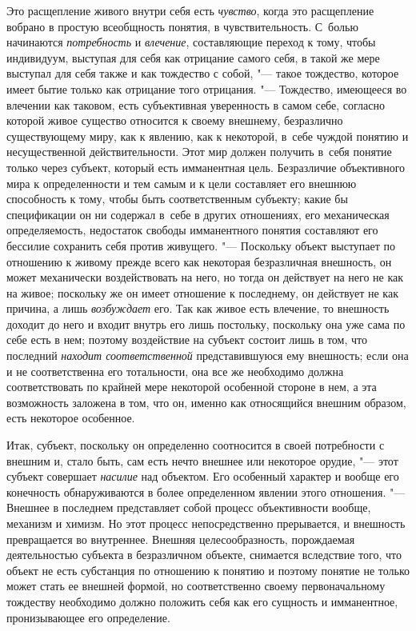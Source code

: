 Это расщепление живого внутри себя есть
{\em чувство}, когда это
расщепление вобрано в простую всеобщность понятия, в чувствительность.
С~болью начинаются {\em потребность}
и {\em влечение},
составляющие переход к тому, чтобы индивидуум, выступая для
себя как отрицание самого себя, в такой же мере выступал для себя также и
как тождество с собой, "--- такое тождество, которое имеет
бытие только как отрицание того отрицания. "--- Тождество,
имеющееся во влечении как таковом, есть субъективная уверенность в самом
себе, согласно которой живое существо относится к своему внешнему,
безразлично существующему миру, как к явлению, как к некоторой, в~себе
чуждой понятию и несущественной действительности. Этот мир
должен получить в~себя понятие только через субъект, который
есть имманентная цель. Безразличие объективного мира к определенности и тем
самым и к цели составляет его внешнюю способность к тому, чтобы быть
соответственным субъекту; какие бы спецификации он ни содержал в~себе в
других отношениях, его механическая определяемость, недостаток свободы
имманентного понятия составляют его бессилие сохранить себя против
живущего. "--- Поскольку объект выступает по отношению к живому
прежде всего как некоторая безразличная внешность, он может механически
воздействовать на него, но тогда он действует на него не как на живое;
поскольку же он имеет отношение к последнему, он действует не как причина,
а лишь {\em возбуждает}
его. Так как живое есть влечение, то внешность доходит до
него и входит внутрь его лишь постольку, поскольку она уже сама по себе
есть в нем; поэтому воздействие на субъект состоит лишь в том, что
последний {\em находит соответственной}
представившуюся ему внешность; если она и не соответственна
его тотальности, она все же необходимо должна соответствовать по крайней
мере некоторой особенной стороне в нем, а эта возможность заложена в том,
что он, именно как относящийся внешним образом, есть некоторое особенное.

Итак, субъект, поскольку он определенно соотносится в своей
потребности с внешним и, стало быть, сам есть нечто внешнее или некоторое
орудие, "--- этот субъект совершает
{\em насилие} над
объектом. Его особенный характер и вообще его конечность обнаруживаются в
более определенном явлении этого отношения. "--- Внешнее в
последнем представляет собой процесс объективности вообще, механизм и
химизм. Но этот процесс непосредственно прерывается, и внешность
превращается во внутреннее. Внешняя целесообразность, порождаемая
деятельностью субъекта в безразличном объекте, снимается вследствие того,
что объект не есть субстанция по отношению к понятию и поэтому понятие не
только может стать ее внешней формой, но соответственно своему
первоначальному тождеству необходимо должно положить себя как его сущность
и имманентное, пронизывающее его определение.

